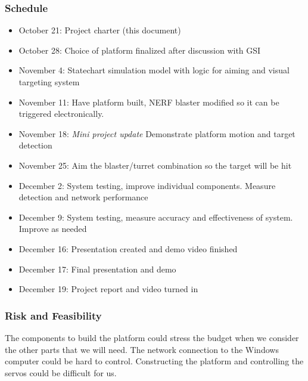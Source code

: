 \documentclass[11pt]{article}
\begin{document}
\subsubsection*{Schedule}
\begin{itemize}
\item October 21: Project charter (this document)
\item October 28: Choice of platform finalized after discussion with GSI
\item November 4: Statechart simulation model with logic for aiming and visual targeting system
\item November 11: Have platform built, NERF blaster modified so it can be triggered electronically.
\item November 18: \textit{Mini project update} Demonstrate platform motion and target detection
\item November 25: Aim the blaster/turret combination so the target will be hit
\item December 2: System testing, improve individual components. Measure detection and network performance
\item December 9: System testing, measure accuracy and effectiveness of system. Improve as needed
\item December 16: Presentation created and demo video finished 
\item December 17: Final presentation and demo 
\item December 19: Project report and video turned in
\end{itemize}
\subsubsection*{Risk and Feasibility} The components to build the platform could stress the budget when we consider the other parts that we will need. The network connection to the Windows computer could be hard to control. Constructing the platform and controlling the servos could be difficult for us.
\end{document}
